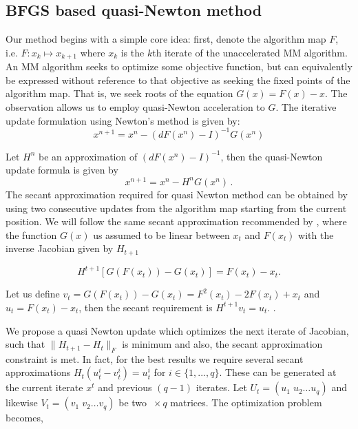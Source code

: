 \documentclass[12pt]{article}
\newcommand{\jx}[1]{{\color{blue}{ #1}}}
\begin{document}
\subsection{BFGS based quasi-Newton method}
Our method begins with a simple core idea: first, denote the algorithm map $F$, i.e.  $F: x_k \mapsto x_{k+1}$ where $x_k$ is the $k$th iterate of the unaccelerated MM algorithm. An MM algorithm seeks to optimize some objective function, but can equivalently be expressed without reference to that objective as seeking the fixed points of the algorithm map. That is, we seek roots of the equation $G(x) = F(x) - x$. The observation allows us to employ quasi-Newton acceleration to $G$. The iterative update formulation using Newton's method is given by:
\[
    x^{n+1} = x^n - (dF(x^n) - I)^{-1}G(x^n)    
\]

Let $H^n$ be an approximation of $(dF(x^n) - I)^{-1}$, then the quasi-Newton update formula is given by
\[
x^{n+1} = x^n - H^n G(x^n)\,.
\]
The secant approximation required for quasi Newton method can be obtained by using two consecutive updates from the algorithm map starting from the current position. We will follow the same secant approximation recommended by \cite{zhou2011quasi}, where the function $G(x)$ us assumed to be linear between $x_t$ and $F(x_t)$ with the inverse Jacobian given by $H_{t+1}$

\begin{equation} \label{eq: secant_approx}
    H^{t+1}\left[G(F(x_t)) - G(x_t)\right] = F(x_t) - x_t.    
\end{equation}


Let us define $v_t = G(F(x_t)) - G(x_t) = F^2(x_t) - 2F(x_t) + x_t$ and $u_t = F(x_t) - x_t$, then the secant requirement is $H^{t+1}v_t = u_t$. \jx{I edited this section, but here we might add a clearer transition to emphasize the fact that one needs to specify additional information in order for the solution to be well-defined rather than underdetermined, and in particular we will instead make use of the objective that allows us to recover Broyden's method for accelerated nonlinear root-finding}. 

We propose a quasi Newton update which optimizes the next iterate of Jacobian, such that $\|H_{t+1}-H_t\|_F$ is minimum and also, the secant approximation constraint is met. In fact, for the best results we require several secant approximations $H_t (u_t^i - v_t^i) = u_t^i$ for $i \in \{1, ..., q\}$. These can be generated at the current iterate $x^t$ and previous $(q-1)$ iterates. Let $U_t = (u_1\;u_2 \dots u_q)$ and likewise $V_t = (v_1 \; v_2 \dots v_q)$ be two $\ \times q$ matrices. The optimization problem becomes,
\end{document}
